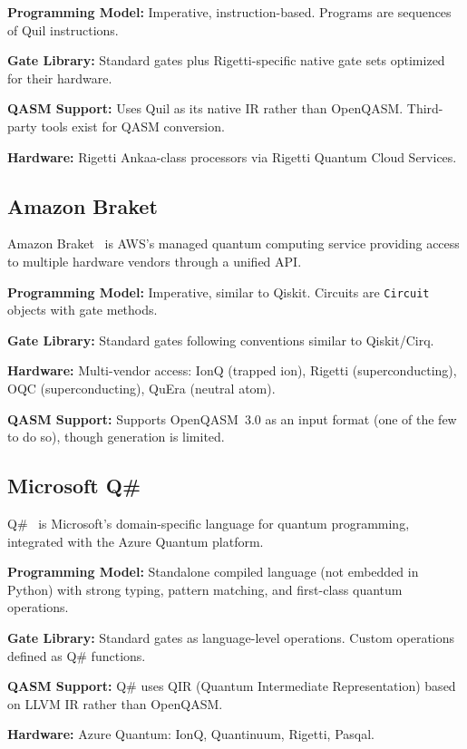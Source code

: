 \documentclass[journal]{IEEEtran}
\begin{document}
\textbf{Programming Model:} Imperative, instruction-based. Programs are sequences of Quil instructions.

\textbf{Gate Library:} Standard gates plus Rigetti-specific native gate sets optimized for their hardware.

\textbf{QASM Support:} Uses Quil as its native IR rather than OpenQASM. Third-party tools exist for QASM conversion.

\textbf{Hardware:} Rigetti Ankaa-class processors via Rigetti Quantum Cloud Services.

\subsection{Amazon Braket}

Amazon Braket~\cite{braket2024} is AWS's managed quantum computing service providing access to multiple hardware vendors through a unified API.

\textbf{Programming Model:} Imperative, similar to Qiskit. Circuits are \texttt{Circuit} objects with gate methods.

\textbf{Gate Library:} Standard gates following conventions similar to Qiskit/Cirq.

\textbf{Hardware:} Multi-vendor access: IonQ (trapped ion), Rigetti (superconducting), OQC (superconducting), QuEra (neutral atom).

\textbf{QASM Support:} Supports OpenQASM~3.0 as an input format (one of the few to do so), though generation is limited.

\subsection{Microsoft Q\#}

Q\#~\cite{svore2018q} is Microsoft's domain-specific language for quantum programming, integrated with the Azure Quantum platform.

\textbf{Programming Model:} Standalone compiled language (not embedded in Python) with strong typing, pattern matching, and first-class quantum operations.

\textbf{Gate Library:} Standard gates as language-level operations. Custom operations defined as Q\# functions.

\textbf{QASM Support:} Q\# uses QIR (Quantum Intermediate Representation) based on LLVM IR rather than OpenQASM.

\textbf{Hardware:} Azure Quantum: IonQ, Quantinuum, Rigetti, Pasqal.
\end{document}
